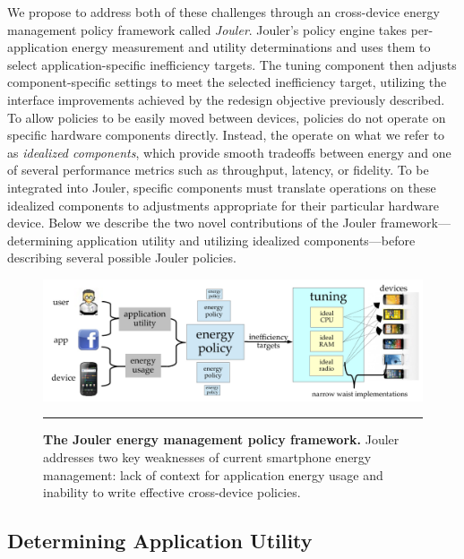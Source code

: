 We propose to address both of these challenges through an cross-device energy
management policy framework called \textit{Jouler}. Jouler's policy engine
takes per-application energy measurement and utility determinations and uses
them to select application-specific inefficiency targets. The tuning
component then adjusts component-specific settings to meet the selected
inefficiency target, utilizing the interface improvements achieved by the
redesign objective previously described. To allow policies to be easily moved
between devices, policies do not operate on specific hardware components
directly. Instead, the operate on what we refer to as \textit{idealized
components}, which provide smooth tradeoffs between energy and one of several
performance metrics such as throughput, latency, or fidelity. To be
integrated into Jouler, specific components must translate operations on
these idealized components to adjustments appropriate for their particular
hardware device. Below we describe the two novel contributions of the Jouler
framework---determining application utility and utilizing idealized
components---before describing several possible Jouler policies.

\begin{figure}
  
  \includegraphics[width=\textwidth]{./figures/jouler.pdf}

  \caption{\textbf{The Jouler energy management policy framework.} Jouler
  addresses two key weaknesses of current smartphone energy management: lack
  of context for application energy usage and inability to write effective
  cross-device policies.}
  
  \vspace*{0.1in}
  \hrule
  \vspace*{-0.1in}
  \label{figure-jouler}

\end{figure}


\subsection{Determining Application Utility}

